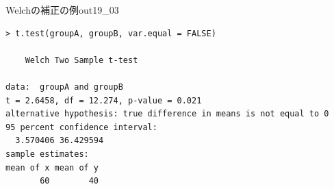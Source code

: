 \begin{Rscreen}{Welchの補正の例}{out19_03}
	\begin{verbatim}
> t.test(groupA, groupB, var.equal = FALSE)

	Welch Two Sample t-test

data:  groupA and groupB
t = 2.6458, df = 12.274, p-value = 0.021
alternative hypothesis: true difference in means is not equal to 0
95 percent confidence interval:
  3.570406 36.429594
sample estimates:
mean of x mean of y 
       60        40 
    \end{verbatim}
\end{Rscreen}
